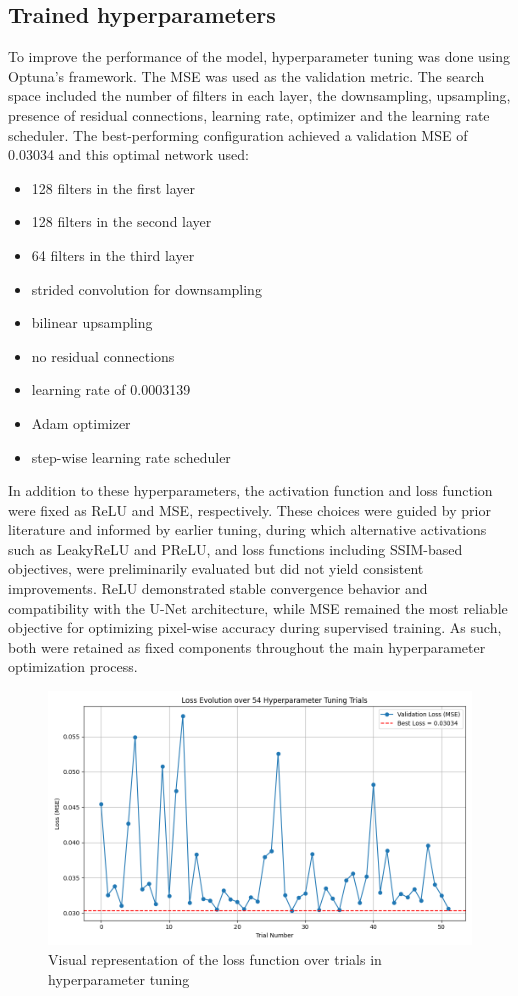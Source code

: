 \documentclass[twocolumn]{article}
\begin{document}
\subsection{Trained hyperparameters}
To improve the performance of the model, hyperparameter tuning was done using Optuna's framework. 
The MSE was used as the validation metric. The search space included the number of filters in each layer, the downsampling, upsampling, presence of residual connections, learning rate, optimizer and the learning rate scheduler. 
The best-performing configuration achieved a validation MSE of 0.03034 and this optimal network used: 
\begin{itemize}
    \item 128 filters in the first layer
    \item 128 filters in the second layer
    \item 64 filters in the third layer
    \item strided convolution for downsampling
    \item bilinear upsampling
    \item no residual connections
    \item learning rate of 0.0003139
    \item Adam optimizer 
    \item step-wise learning rate scheduler
\end{itemize}

In addition to these hyperparameters, the activation function and loss function were fixed as ReLU and MSE, respectively. 
These choices were guided by prior literature and informed by earlier tuning, during which alternative activations such as LeakyReLU and PReLU, and loss functions including SSIM-based objectives, were preliminarily evaluated but did not yield consistent improvements. 
ReLU demonstrated stable convergence behavior and compatibility with the U-Net architecture, while MSE remained the most reliable objective for optimizing pixel-wise accuracy during supervised training.
As such, both were retained as fixed components throughout the main hyperparameter optimization process. 

\begin{figure}[h]
    \centering
    \includegraphics[width=1\linewidth]{loss_hyperparameters.png}
    \caption{Visual representation of the loss function over trials in hyperparameter tuning}
    \label{fig:loss_hyperparameter}
\end{figure}
\end{document}
